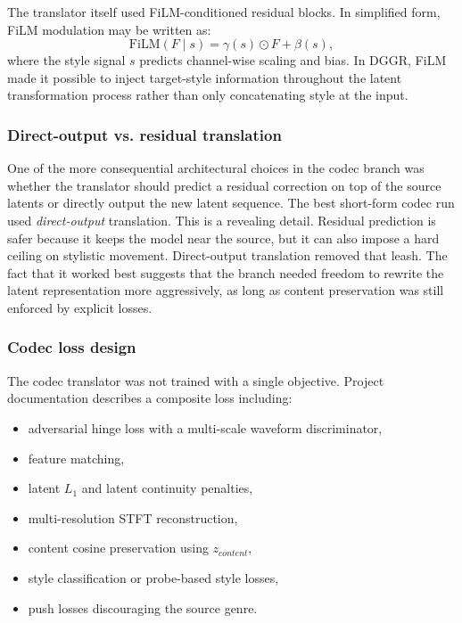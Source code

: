 \documentclass[conference]{IEEEtran}
\begin{document}
The translator itself used FiLM-conditioned residual blocks. In simplified form, FiLM modulation may be written as:
\begin{equation}
\mathrm{FiLM}(F \mid s)=\gamma(s)\odot F + \beta(s),
\end{equation}
where the style signal $s$ predicts channel-wise scaling and bias. In DGGR, FiLM made it possible to inject target-style information throughout the latent transformation process rather than only concatenating style at the input.

\subsubsection{Direct-output vs. residual translation}
One of the more consequential architectural choices in the codec branch was whether the translator should predict a residual correction on top of the source latents or directly output the new latent sequence. The best short-form codec run used \emph{direct-output} translation. This is a revealing detail. Residual prediction is safer because it keeps the model near the source, but it can also impose a hard ceiling on stylistic movement. Direct-output translation removed that leash. The fact that it worked best suggests that the branch needed freedom to rewrite the latent representation more aggressively, as long as content preservation was still enforced by explicit losses.

\subsubsection{Codec loss design}
The codec translator was not trained with a single objective. Project documentation describes a composite loss including:
\begin{itemize}[leftmargin=1.5em]
    \item adversarial hinge loss with a multi-scale waveform discriminator,
    \item feature matching,
    \item latent $L_1$ and latent continuity penalties,
    \item multi-resolution STFT reconstruction,
    \item content cosine preservation using $z_{content}$,
    \item style classification or probe-based style losses,
    \item push losses discouraging the source genre.
\end{itemize}
\end{document}
